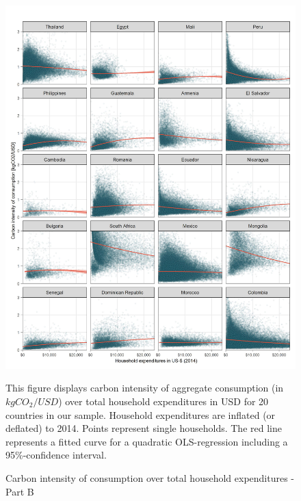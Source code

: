 \documentclass[12pt, a4paper]{article}
\newenvironment{subcaption}
{\strut
\vspace{-5pt}
\begin{minipage}[b]{0.9\textwidth}
  \hspace*{-\parindent}
  \footnotesize}
 {\end{minipage}}
\begin{document}
\begin{figure}[ht!]
  \centering
  \caption{Carbon intensity of consumption over total household expenditures - Part B} \label{fig:C2}
  \includegraphics{Analysis_Carbon_Intensity_Curve/All_Panel_B}
  \begin{subcaption}
    This figure displays carbon intensity of aggregate consumption (in $kgCO_{2}/USD$) over total household expenditures in USD for 20 countries in our sample. Household expenditures are inflated (or deflated) to 2014. Points represent single households. The red line represents a fitted curve for a quadratic OLS-regression including a 95\%-confidence interval.
  \end{subcaption}

\end{figure}

\clearpage
\end{document}
